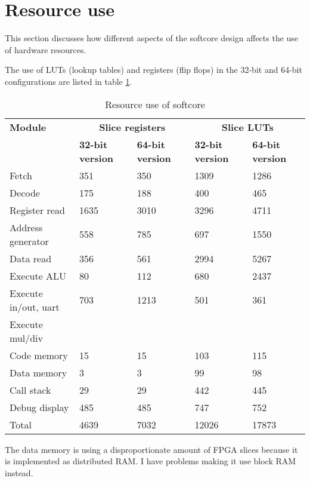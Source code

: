 \documentclass[11pt,a4paper,oneside,openright]{report}
\newcommand{\vv}{ \vspace{2mm} }   %
\begin{document}
\section{Resource use}
This section discusses how different aspects of the softcore design affects the use of hardware resources.
\vv

The use of LUTs (lookup tables) and registers (flip flops) in the 32-bit and 64-bit configurations are listed in table \ref{table:ResourceUse}.

\begin{table}[h]
\begin{tabular}{|l|l|l|l|l|} 
\hline
\bfseries Module & \multicolumn{2}{|c|}{\bfseries Slice registers} & \multicolumn{2}{c|}{\bfseries Slice LUTs}  \\
\bfseries  & \bfseries 32-bit version & \bfseries 64-bit version & \bfseries 32-bit version & \bfseries 64-bit version  \\ \hline
Fetch  &  351 &  350  & 1309 & 1286 \\ \hline
Decode  & 175  &  188 & 400 & 465 \\ \hline
Register read & 1635  &  3010 & 3296 & 4711 \\ \hline
Address generator  & 558 & 785 & 697 & 1550 \\ \hline
Data read  & 356  & 561 & 2994 & 5267  \\ \hline
Execute ALU  & 80  & 112 & 680 & 2437 \\ \hline
Execute in/out, uart  & 703 & 1213 & 501 & 361 \\ \hline
Execute mul/div  &   &  &  &   \\ \hline
Code memory  & 15  & 15  & 103 & 115 \\ \hline
Data memory  & 3  &  3  & 99 & 98 \\ \hline
Call stack  & 29  &  29  & 442 & 445 \\ \hline
Debug display  & 485  & 485  & 747 & 752 \\ \hline
Total  & 4639  & 7032  & 12026 & 17873 \\ \hline
\end{tabular}
\caption{Resource use of softcore}
\label{table:ResourceUse}
\end{table}
\vv

The data memory is using a disproportionate amount of FPGA slices because it is implemented as distributed RAM. I have problems making it use block RAM instead.
\vv
\end{document}
